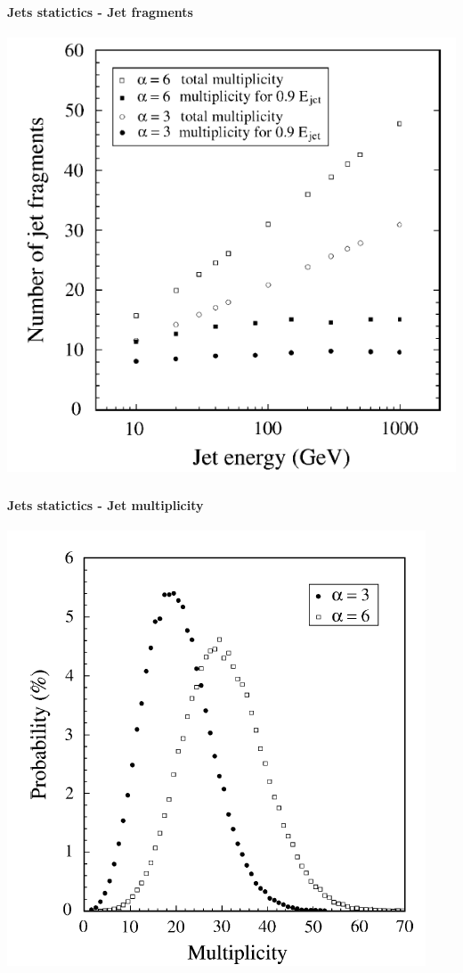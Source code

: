 \documentclass[8pt]{beamer}
\begin{document}
  \begin{frame}
  \frametitle{\backup}
  \framesubtitle{Jets statictics - Jet fragments}
    \begin{center}
      \includegraphics[width=0.7\linewidth]{jet_fragments.png}
    \end{center}
  \end{frame}

  \begin{frame}
  \frametitle{\backup}
  \framesubtitle{Jets statictics - Jet multiplicity}
    \begin{center}
      \includegraphics[width=0.7\linewidth]{jet_multiplicity.png}
    \end{center}
  \end{frame}
\end{document}
